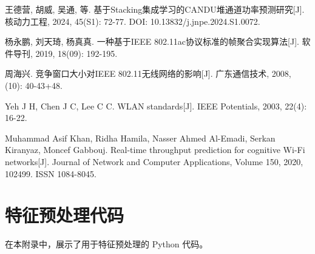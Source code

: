 \documentclass[bwprint,fontset=windows]{gmcmthesis}
\begin{document}
\newpage

\begin{thebibliography}{9}
	
	王德营, 胡威, 吴通, 等. 基于Stacking集成学习的CANDU堆通道功率预测研究[J]. 核动力工程, 2024, 45(S1): 72-77. DOI: 10.13832/j.jnpe.2024.S1.0072.
	
	杨永鹏, 刘天琦, 杨真真. 一种基于IEEE 802.11ac协议标准的帧聚合实现算法[J]. 软件导刊, 2019, 18(09): 192-195.
	
	周海兴. 竞争窗口大小对IEEE 802.11无线网络的影响[J]. 广东通信技术, 2008, (10): 40-43+48.
	
	Yeh J H, Chen J C, Lee C C. WLAN standards[J]. IEEE Potentials, 2003, 22(4): 16-22.
	
	Muhammad Asif Khan, Ridha Hamila, Nasser Ahmed Al-Emadi, Serkan Kiranyaz, Moncef Gabbouj. Real-time throughput prediction for cognitive Wi-Fi networks[J]. Journal of Network and Computer Applications, Volume 150, 2020, 102499. ISSN 1084-8045.
	
\end{thebibliography}



\newpage

\appendix
\section{特征预处理代码}

\noindent 在本附录中，展示了用于特征预处理的 Python 代码。
\end{document}
